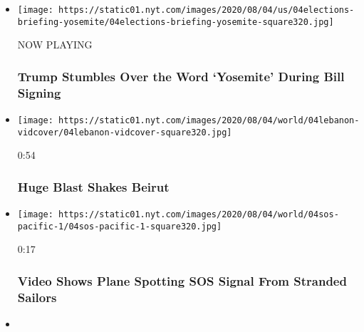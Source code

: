\begin{itemize}
\item
  \texttt{[image: https://static01.nyt.com/images/2020/08/04/us/04elections-briefing-yosemite/04elections-briefing-yosemite-square320.jpg]}

  NOW PLAYING

  \hypertarget{trump-stumbles-over-the-word-yosemite-during-bill-signing-2}{%
  \subsubsection{Trump Stumbles Over the Word `Yosemite' During Bill
  Signing}\label{trump-stumbles-over-the-word-yosemite-during-bill-signing-2}}
\item
  \href{https://www.nytimes.com/video/world/100000007272075/lebanon-beirut-blast.html?action=click\&module=video-series-bar\&region=header\&pgtype=Article\&playlistId=video/latest-video}{}

  \texttt{[image: https://static01.nyt.com/images/2020/08/04/world/04lebanon-vidcover/04lebanon-vidcover-square320.jpg]}

  0:54

  \hypertarget{huge-blast-shakes-beirut}{%
  \subsubsection{Huge Blast Shakes
  Beirut}\label{huge-blast-shakes-beirut}}
\item
  \href{https://www.nytimes.com/video/world/100000007271927/pacific-island-rescue-video.html?action=click\&module=video-series-bar\&region=header\&pgtype=Article\&playlistId=video/latest-video}{}

  \texttt{[image: https://static01.nyt.com/images/2020/08/04/world/04sos-pacific-1/04sos-pacific-1-square320.jpg]}

  0:17

  \hypertarget{video-shows-plane-spotting-sos-signal-from-stranded-sailors}{%
  \subsubsection{Video Shows Plane Spotting SOS Signal From Stranded
  Sailors}\label{video-shows-plane-spotting-sos-signal-from-stranded-sailors}}
\item
  \href{https://www.nytimes.com/video/us/100000007271780/wyoming-hot-air-balloon-crash.html?action=click\&module=video-series-bar\&region=header\&pgtype=Article\&playlistId=video/latest-video}{}


\end{itemize}
